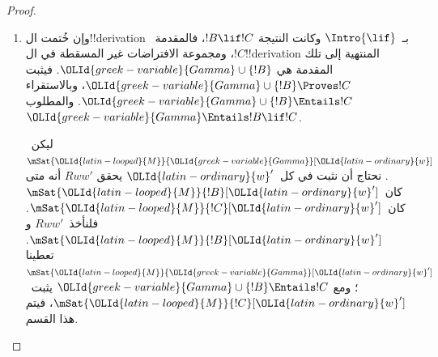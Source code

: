 \documentclass[../../../include/open-logic-section]{subfiles}
\begin{document}
\begin{proof}
\begin{enumerate}
{    ليكن~$\mSat{{\OLId{latin-looped}{M}}}{{\OLId{greek-variable}{Gamma}} \cup {\OLId{greek-variable}{Delta}}_{\OLMathNumeral{1}} \cup {\OLId{greek-variable}{Delta}}_{\OLMathNumeral{2}}}[{\OLId{latin-ordinary}{w}}]$. فنستخلص
    $\mSat{{\OLId{latin-looped}{M}}}{{\OLId{greek-variable}{Gamma}}}[{\OLId{latin-ordinary}{w}}]$، ومن~${\OLId{greek-variable}{Gamma}} \Entails !B \lor !C$ يلزم
    $\mSat{{\OLId{latin-looped}{M}}}{!B \lor !C}[{\OLId{latin-ordinary}{w}}]$. وتعريف~$\mSat{{\OLId{latin-looped}{M}}}{}$ يقسم الأمر قسمين:
    إما~$\mSat{{\OLId{latin-looped}{M}}}{!B}[{\OLId{latin-ordinary}{w}}]$ وإما~$\mSat{{\OLId{latin-looped}{M}}}{!C}[{\OLId{latin-ordinary}{w}}]$.
    (أ) إن كان~$\mSat{{\OLId{latin-looped}{M}}}{!B}[{\OLId{latin-ordinary}{w}}]$، كان
    $\mSat{{\OLId{latin-looped}{M}}}{{\OLId{greek-variable}{Delta}}_{\OLMathNumeral{1}} \cup \{!B\}}[{\OLId{latin-ordinary}{w}}]$؛ ومع
    ${\OLId{greek-variable}{Delta}}_{\OLMathNumeral{1}} \cup \{!B\} \Entails !D$ يثبت~$\mSat{{\OLId{latin-looped}{M}}}{!D}[{\OLId{latin-ordinary}{w}}]$.
    (ب) وإن كان~$\mSat{{\OLId{latin-looped}{M}}}{!C}[{\OLId{latin-ordinary}{w}}]$، كان
    $\mSat{{\OLId{latin-looped}{M}}}{{\OLId{greek-variable}{Delta}}_{\OLMathNumeral{2}} \cup \{!C\}}[{\OLId{latin-ordinary}{w}}]$؛ ومع
    ${\OLId{greek-variable}{Delta}}_{\OLMathNumeral{2}} \cup \{!C\} \Entails !D$ يثبت~$\mSat{{\OLId{latin-looped}{M}}}{!D}[{\OLId{latin-ordinary}{w}}]$.
    فالحاصل على كلا الوجهين~$\mSat{{\OLId{latin-looped}{M}}}{!D}[{\OLId{latin-ordinary}{w}}]$، وهذا مرادنا.}

  \item وإن خُتمت ال!!{derivation} بـ~$\Intro{\lif}$ وكانت النتيجة
    $!B \lif !C$، فالمقدمة~$!C$، ومجموعة الافتراضات غير المسقطة في
    ال!!{derivation} المنتهية إلى تلك المقدمة هي
    ${\OLId{greek-variable}{Gamma}} \cup \{!B\}$. فيثبت
    ${\OLId{greek-variable}{Gamma}} \cup \{!B\} \Proves !C$، وبالاستقراء
    ${\OLId{greek-variable}{Gamma}} \cup \{!B\} \Entails !C$. والمطلوب
    ${\OLId{greek-variable}{Gamma}} \Entails !B \lif !C$.

    ليكن~$\mSat{{\OLId{latin-looped}{M}}}{{\OLId{greek-variable}{Gamma}}}[{\OLId{latin-ordinary}{w}}]$. نحتاج أن نثبت في كل~${\OLId{latin-ordinary}{w}}'$ يحقق
    $Rww'$ أنه متى كان~$\mSat{{\OLId{latin-looped}{M}}}{!B}[{\OLId{latin-ordinary}{w}}']$ كان~$\mSat{{\OLId{latin-looped}{M}}}{!C}[{\OLId{latin-ordinary}{w}}']$.
    فلنأخذ~$Rww'$ و$\mSat{{\OLId{latin-looped}{M}}}{!B}[{\OLId{latin-ordinary}{w}}']$. تعطينا
    $\mSat{{\OLId{latin-looped}{M}}}{{\OLId{greek-variable}{Gamma}}}[{\OLId{latin-ordinary}{w}}']$؛ ومع
    ${\OLId{greek-variable}{Gamma}} \cup \{!B\} \Entails !C$ يثبت~$\mSat{{\OLId{latin-looped}{M}}}{!C}[{\OLId{latin-ordinary}{w}}']$،
    فيتم هذا القسم.


\end{enumerate}
\end{proof}
\end{document}
